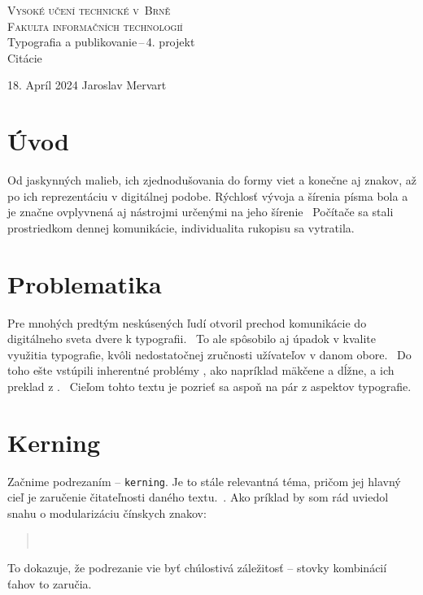 \documentclass[11pt]{article}
\begin{document}
\begin{titlepage}
\begin{center}
    \Huge
	\textsc{Vysoké učení technické v~Brně}\\
    \huge
	{\textsc{Fakulta informačních technologií }}\\
	
	\LARGE
	Typografia a publikovanie\,--\,4. projekt\\
	\Huge
    Citácie\\
	
\end{center}
{\Large 18. Apríl 2024 \hfill
Jaroslav Mervart}
\end{titlepage}
\section*{Úvod}
Od jaskynných malieb, ich zjednodušovania do formy viet a konečne aj znakov, až po ich reprezentáciu v digitálnej podobe. Rýchlosť vývoja a šírenia písma bola a je značne ovplyvnená aj nástrojmi určenými na jeho šírenie~\cite{Jiricek} Počítače sa stali prostriedkom dennej komunikácie, individualita rukopisu sa vytratila.~\cite{someARt}

\section{Problematika}
Pre mnohých predtým neskúsených ľudí otvoril prechod komunikácie do digitálneho sveta dvere k typografii.~\cite{IBMstuff} To ale spôsobilo aj úpadok v kvalite využitia typografie, kvôli nedostatočnej zručnosti užívateľov v danom obore.~\cite{DobraTypogWhere} Do toho ešte vstúpili inherentné problémy , ako napríklad mäkčene a dĺžne, a ich preklad z .~\cite{FontyvCs} Cieľom tohto textu je pozrieť sa aspoň na pár z aspektov typografie.

\section{Kerning}
Začnime podrezaním -- \texttt{kerning}. Je to stále relevantná téma, pričom jej hlavný cieľ je zaručenie čitateľnosti daného textu.~\cite{Macek2008}. Ako príklad by som rád uviedol snahu o modularizáciu čínskych znakov:
    \begin{quote}
        ~\cite{ConferenceChina}
    \end{quote}
To dokazuje, že podrezanie vie byť chúlostivá záležitosť -- stovky kombinácií ťahov to zaručia.
\end{document}
